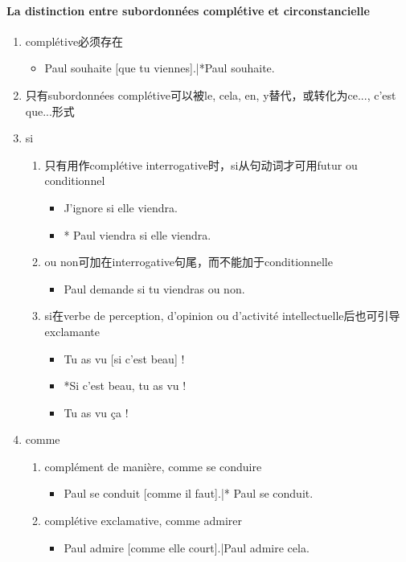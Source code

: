 \documentclass[UTF8]{report}
\begin{document}
\paragraph{La distinction entre subordonnées complétive et circonstancielle}
\begin{enumerate}
    \item complétive必须存在
    \begin{itemize}
        \item Paul souhaite [que tu viennes].|*Paul souhaite.
    \end{itemize}
    \item 只有subordonnées complétive可以被le, cela, en, y替代，或转化为ce..., c’est que...形式
    \item si
    \begin{enumerate}
        \item 只有用作complétive interrogative时，si从句动词才可用futur ou conditionnel
        \begin{itemize}
            \item J’ignore si elle viendra.
            \item * Paul viendra si elle viendra.
        \end{itemize}
        \item ou non可加在interrogative句尾，而不能加于conditionnelle
        \begin{itemize}
            \item Paul demande si tu viendras ou non.
        \end{itemize}
        \item si在verbe de perception, d’opinion ou d’activité intellectuelle后也可引导exclamante
        \begin{itemize}
            \item Tu as vu [si c’est beau] !
            \item *Si c’est beau, tu as vu !
            \item Tu as vu ça !
        \end{itemize}
    \end{enumerate}
    \item comme
    \begin{enumerate}
        \item complément de manière, comme se conduire
        \begin{itemize}
            \item Paul se conduit [comme il faut].|* Paul se conduit.
        \end{itemize}
        \item complétive exclamative, comme admirer
        \begin{itemize}
            \item Paul admire [comme elle court].|Paul admire cela.
        \end{itemize}
    \end{enumerate}
\end{enumerate}
\end{document}
